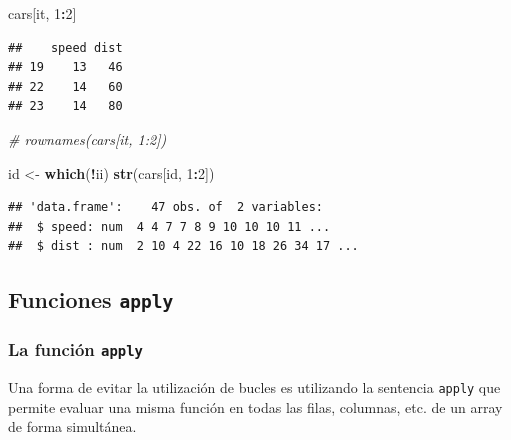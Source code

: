 \documentclass[]{book}
\newenvironment{Shaded}{\begin{snugshade}}{\end{snugshade}}
\newcommand{\CommentTok}[1]{\textcolor[rgb]{0.56,0.35,0.01}{\textit{#1}}}
\newcommand{\DecValTok}[1]{\textcolor[rgb]{0.00,0.00,0.81}{#1}}
\newcommand{\KeywordTok}[1]{\textcolor[rgb]{0.13,0.29,0.53}{\textbf{#1}}}
\newcommand{\NormalTok}[1]{#1}
\newcommand{\OperatorTok}[1]{\textcolor[rgb]{0.81,0.36,0.00}{\textbf{#1}}}
\newcommand{\StringTok}[1]{\textcolor[rgb]{0.31,0.60,0.02}{#1}}
\begin{document}
\begin{Shaded}
\begin{Highlighting}[]
\NormalTok{cars[it, }\DecValTok{1}\OperatorTok{:}\DecValTok{2}\NormalTok{]}
\end{Highlighting}
\end{Shaded}

\begin{verbatim}
##    speed dist
## 19    13   46
## 22    14   60
## 23    14   80
\end{verbatim}

\begin{Shaded}
\begin{Highlighting}[]
\CommentTok{# rownames(cars[it, 1:2])}

\NormalTok{id <-}\StringTok{ }\KeywordTok{which}\NormalTok{(}\OperatorTok{!}\NormalTok{ii)}
\KeywordTok{str}\NormalTok{(cars[id, }\DecValTok{1}\OperatorTok{:}\DecValTok{2}\NormalTok{])}
\end{Highlighting}
\end{Shaded}

\begin{verbatim}
## 'data.frame':    47 obs. of  2 variables:
##  $ speed: num  4 4 7 7 8 9 10 10 10 11 ...
##  $ dist : num  2 10 4 22 16 10 18 26 34 17 ...
\end{verbatim}

\begin{Shaded}
\end{Shaded}

\hypertarget{funciones-apply}{%
\subsection{\texorpdfstring{Funciones \texttt{apply}}{Funciones apply}}\label{funciones-apply}}

\hypertarget{la-funcion-apply}{%
\subsubsection{\texorpdfstring{La función \texttt{apply}}{La función apply}}\label{la-funcion-apply}}

Una forma de evitar la
utilización de bucles es utilizando la sentencia \texttt{apply} que permite
evaluar una misma función en todas las filas, columnas, etc. de un array
de forma simultánea.
\end{document}
